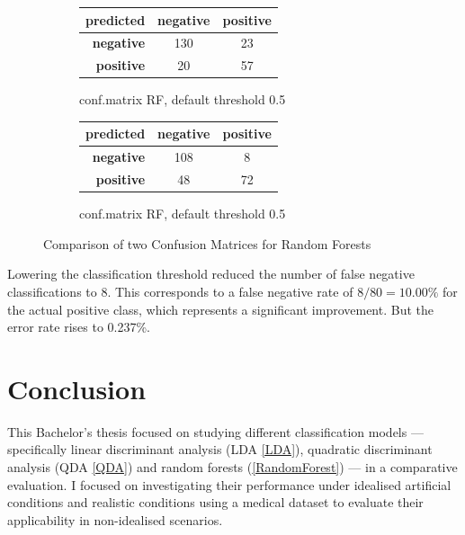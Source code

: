 \documentclass[12pt,a4paper,titlepage]{article}
\numberwithin{equation}{section}
\numberwithin{table}{section}
\numberwithin{figure}{section}
\begin{document}
\begin{figure}[h]
    \centering 
    \begin{subfigure}{0.45\textwidth}
        \centering
        \caption{conf.matrix RF, default threshold 0.5}
        \label{fig:conf_ldapima}
        \begin{tabular}{r|cc}
            \toprule
            \textbf{predicted} & \textbf{negative} & \textbf{positive} \\
            \midrule
            \textbf{negative} & 130   & 23 \\
            \textbf{positive} & 20 & 57 \\
            \bottomrule
        \end{tabular}
    \end{subfigure}
    \hfill
    \begin{subfigure}{0.45\textwidth}
        \centering
        \caption{conf.matrix RF, default threshold 0.5}
        \label{fig:conf_ldapimaadj}
        \begin{tabular}{r|cc}
            \toprule
            \textbf{predicted} & \textbf{negative} & \textbf{positive} \\
            \midrule
            \textbf{negative} & 108   & 8 \\
            \textbf{positive} & 48 & 72 \\
            \bottomrule
        \end{tabular}
    \end{subfigure}
    \caption{Comparison of two Confusion Matrices  for Random Forests}
    \label{fig:two_confusion_matrices}
\end{figure}
\noindent Lowering the classification threshold reduced the number of false negative classifications to 8. This corresponds to a false negative rate of $8/80=10.00\%$ for the actual positive class, which represents a significant improvement. But the error rate rises to 0.237\%.

\section{Conclusion}
This Bachelor's thesis focused on studying different classification models — specifically linear discriminant analysis (LDA \ref{LDA}), quadratic discriminant analysis (QDA \ref{QDA}) and random forests (\ref{RandomForest}) — in a comparative evaluation. I focused on investigating their performance under idealised artificial conditions and realistic conditions using a medical dataset to evaluate their applicability in non-idealised scenarios.
\end{document}
